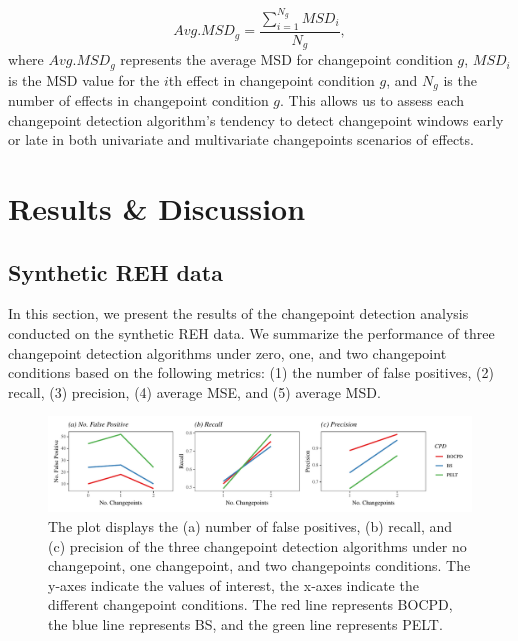 \documentclass[]{interact}
\theoremstyle{plain}%
\theoremstyle{definition}
\theoremstyle{remark}
\begin{document}
	\begin{equation} \label{12}
		Avg.MSD_g = \frac{\sum_{i=1}^{N_g} MSD_i}{N_g},
	\end{equation}
	where $Avg.MSD_g$ represents the average MSD for changepoint condition $g$, $MSD_i$ is the MSD value for the $i$th effect in changepoint condition $g$, and $N_g$ is the number of effects in changepoint condition $g$. This allows us to assess each changepoint detection algorithm's tendency to detect changepoint windows early or late in both univariate and multivariate changepoints scenarios of effects.
	
	\section{\fontsize{14}{15}\selectfont Results \& Discussion} \label{sec:results}
	
	\subsection{Synthetic REH data} \label{res:simulation}
	
	\hspace{0.28cm} In this section, we present the results of the changepoint detection analysis conducted on the synthetic REH data. We summarize the performance of three changepoint detection algorithms under zero, one, and two changepoint conditions based on the following metrics: (1) the number of false positives, (2) recall, (3) precision, (4) average MSE, and (5) average MSD.
	
	\begin{figure}[H]
		\captionsetup{justification=raggedright}
		\renewcommand{\figurename}{Figure}
		\centering
		\includegraphics[width=\textwidth,height=\textheight,keepaspectratio]{FPTPRPPV}
		\caption{\fontsize{8}{10}\selectfont The plot displays the (a) number of false positives, (b) recall, and (c) precision of the three changepoint detection algorithms under no changepoint, one changepoint, and two changepoints conditions. The y-axes indicate the values of interest, the x-axes indicate the different changepoint conditions. The red line represents BOCPD, the blue line represents BS, and the green line represents PELT.}
		\label{Figure 3}
	\end{figure}
	
\end{document}
